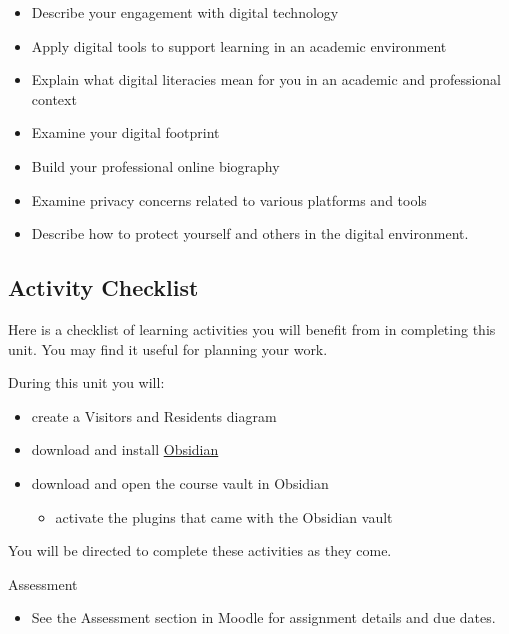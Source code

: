\documentclass[
]{book}
\providecommand{\tightlist}{%
  \setlength{\itemsep}{0pt}\setlength{\parskip}{0pt}}
\theoremstyle{definition}
\theoremstyle{definition}
\theoremstyle{definition}
\theoremstyle{definition}
\theoremstyle{remark}
\begin{document}
\begin{itemize}
\tightlist
\item
  Describe your engagement with digital technology
\item
  Apply digital tools to support learning in an academic environment
\item
  Explain what digital literacies mean for you in an academic and professional context
\item
  Examine your digital footprint
\item
  Build your professional online biography
\item
  Examine privacy concerns related to various platforms and tools
\item
  Describe how to protect yourself and others in the digital environment.
\end{itemize}

\hypertarget{activity-checklist}{%
\subsection*{Activity Checklist}\label{activity-checklist}}

Here is a checklist of learning activities you will benefit from in completing this unit. You may find it useful for planning your work.

\begin{reflect}
During this unit you will:

\begin{itemize}
\tightlist
\item
  create a Visitors and Residents diagram
\item
  download and install \href{https://obsidian.md}{Obsidian}
\item
  download and open the course vault in Obsidian

  \begin{itemize}
  \tightlist
  \item
    activate the plugins that came with the Obsidian vault
  \end{itemize}
\end{itemize}

You will be directed to complete these activities as they come.
\end{reflect}

\begin{assessment}
{Assessment}

\begin{itemize}
\tightlist
\item
  See the Assessment section in Moodle for assignment details and due dates.
\end{itemize}
\end{assessment}
\end{document}

